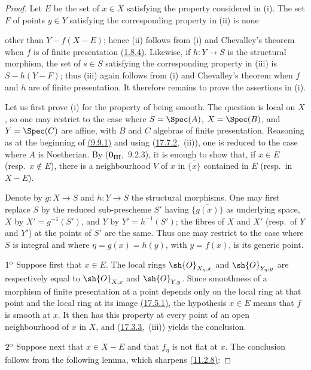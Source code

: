 \begin{proof}
Let $E$ be the set of $x\in X$ satisfying the property considered in (i).
The set $F$ of points $y\in Y$ satisfying the corresponding property in (ii) is none


other than $Y-f(X-E)$; hence (ii) follows from (i) and Chevalley's theorem when $f$ is of finite presentation {\hyperlink{ega4.c04.thm.1-8-4}{(1.8.4)}}.
Likewise, if $h:Y\to S$ is the structural morphism, the set of $s\in S$ satisfying the corresponding property in (iii) is $S-h(Y-F)$; thus (iii) again follows from (i) and Chevalley's theorem when $f$ and $h$ are of finite presentation.
It therefore remains to prove the assertions in (i).

Let us first prove (i) for the property of being smooth.
The question is local on $X$, so one may restrict to the case where $S=\Spec(A)$, $X=\Spec(B)$, and $Y=\Spec(C)$ are affine, with $B$ and $C$ algebras of finite presentation.
Reasoning as at the beginning of {\hyperlink{ega4.c04.prop.9-9-1}{(9.9.1)}} and using ({\hyperlink{ega4.c04.cor.17-7-2}{17.7.2}},~(ii)), one is reduced to the case where $A$ is Noetherian.
By ($\mathbf{0}_\mathbf{III}$,~9.2.3), it is enough to show that, if $x\in E$ (resp.\ $x\notin E$), there is a neighbourhood $V$ of $x$ in $\overline{\{x\}}$ contained in $E$ (resp.\ in $X-E$).

Denote by $g:X\to S$ and $h:Y\to S$ the structural morphisms.
One may first replace $S$ by the reduced sub-prescheme $S'$ having $\overline{\{g(x)\}}$ as underlying space, $X$ by $X'=g^{-1}(S')$, and $Y$ by $Y'=h^{-1}(S')$; the fibres of $X$ and $X'$ (resp.\ of $Y$ and $Y'$) at the points of $S'$ are the same.
Thus one may restrict to the case where $S$ is integral and where $\eta=g(x)=h(y)$, with $y=f(x)$, is its generic point.

$1\textsuperscript{o}$ Suppose first that $x\in E$.
The local rings $\sh{O}_{X_\eta,x}$ and $\sh{O}_{Y_\eta,y}$ are respectively equal to $\sh{O}_{X,x}$ and $\sh{O}_{Y,y}$.
Since smoothness of a morphism of finite presentation at a point depends only on the local ring at that point and the local ring at its image {\hyperlink{ega4.c04.thm.17-5-1}{(17.5.1)}}, the hypothesis $x\in E$ means that $f$ is smooth at $x$.
It then has this property at every point of an open neighbourhood of $x$ in $X$, and ({\hyperlink{ega4.c04.prop.17-3-3}{17.3.3}},~(iii)) yields the conclusion.

$2\textsuperscript{o}$ Suppose next that $x\in X-E$ and that $f_\eta$ is not flat at $x$.
The conclusion follows from the following lemma, which sharpens {\hyperlink{ega4.c04.prop.11-2-8}{(11.2.8)}}:


\end{proof}
